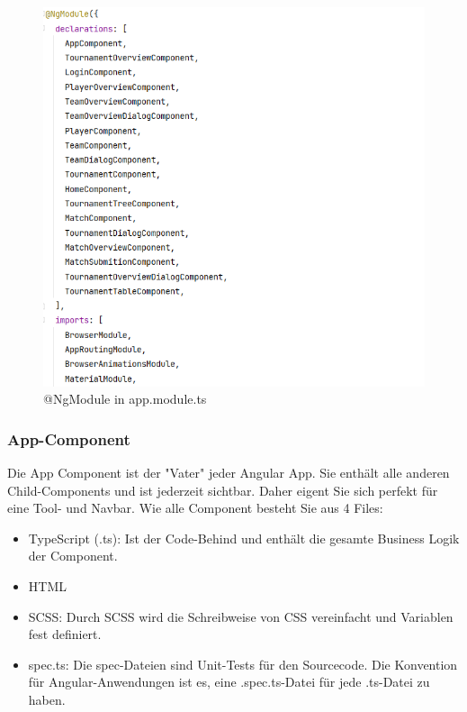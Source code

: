 \begin{figure}[H]
    \includegraphics[scale=0.5]{pics/frontend/app_module.PNG}
    \caption{@NgModule in app.module.ts}
\end{figure}

\subsubsection{App-Component}

Die App Component ist der "Vater" jeder Angular App. Sie enthält alle anderen Child-Components und ist jederzeit sichtbar.
Daher eigent Sie sich perfekt für eine Tool- und Navbar. 
Wie alle Component besteht Sie aus 4 Files:
\begin{itemize}
    \item TypeScript (.ts): Ist der Code-Behind und enthält die gesamte Business Logik der Component. 
    \item HTML
    \item SCSS: Durch SCSS wird die Schreibweise von CSS vereinfacht und Variablen fest definiert.
    \item spec.ts: Die spec-Dateien sind Unit-Tests für den Sourcecode. Die Konvention für Angular-Anwendungen ist es, eine .spec.ts-Datei für jede .ts-Datei zu haben. \cite{implementation-angular-2}
\end{itemize}

